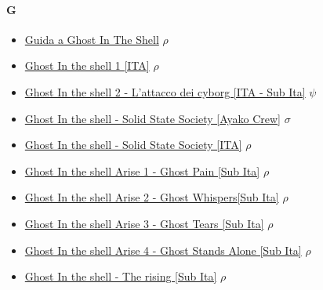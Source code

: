 		\paragraph{G} \hypertarget{FG}{}
			\begin{itemize}
				\item \href{https://mega.nz/#!dFhXBJQT!cXfScy_Ctw0USQNdIYem-pKwphbcsAih_xuAMhkJuoA} {Guida a Ghost In The Shell}  $\rho$   \\
				\item \href{https://mega.nz/#!RQQmGBSb!iKMp2T4P_IPGYKcIH1PqsjeFuvxEF9ykcJxDNv4HODE} {Ghost In the shell 1 [ITA]}  $\rho$   \\
				\item \href{https://mega.nz/#!Ds8TVbYC!9nRI5pDxd3lsILpMCjr7noIhPkB1XV8MMKWF5nb_fMg} {Ghost In the shell 2 - L'attacco dei cyborg [ITA - Sub Ita]}  $\psi$   \\
				\item \href{https://mega.nz/#!cVVkiJ6Q!k1q6gTAVXrnHLKXrBT2hw4qPo-Je40VO5p03Hbqjnlg} {Ghost In the shell - Solid State Society [Ayako Crew]}  $\sigma$   \\
				\item \href{https://mega.nz/#!NNwTQLrD!7qrAOXhBYWoqijNpHccAlB6itxQ_3lbDdJYlU210GeE} {Ghost In the shell - Solid State Society [ITA]}  $\rho$   \\
				\item \href{https://mega.nz/#!5Iw30Yja!Y3_uQU55sbw-Y0CympcuQxw1vKSIEJuOFp7XkYBuJm8} {Ghost In the shell Arise 1 - Ghost Pain [Sub Ita]}  $\rho$   \\
				\item \href{https://mega.nz/#F!RMB2wKYB!2smuROGJbTQ03eogdbATBw} {Ghost In the shell Arise 2 - Ghost Whispers[Sub Ita]}  $\rho$   \\
				\item \href{https://mega.nz/#!QAB2nIZQ!4pcnTVnclnynxZfQoil23dAjijZ1i16ubPvqV4zjuok} {Ghost In the shell Arise 3 - Ghost Tears [Sub Ita]}  $\rho$   \\
				\item \href{https://mega.nz/#F!kdgTnZZQ!eOF4W4UbNz2mEfzoZCQ51g} {Ghost In the shell Arise 4 - Ghost Stands Alone [Sub Ita]}  $\rho$   \\
				\item \href{https://mega.nz/#!YBI2FIbI!Siw5Qt_8tZaOKvIH8m-2dLQ_3eBmetycTORvRhIrte0} {Ghost In the shell - The rising [Sub Ita]}  $\rho$   \\
			
			\end{itemize}
		
